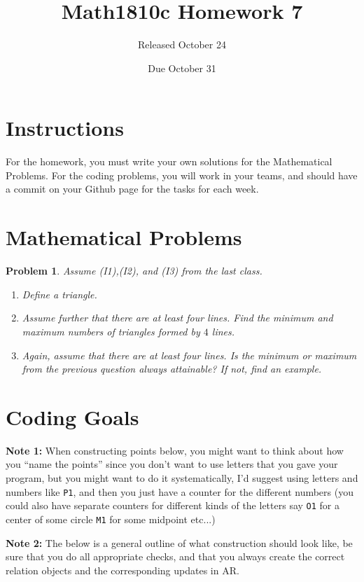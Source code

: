 \documentclass{article}
\title{Math1810c Homework 7}
\author{Released October 24}
\date{Due October 31}
\newtheorem{problem}{Problem}
\begin{document}
\maketitle

\section{Instructions}

For the homework, you must write your own solutions for the Mathematical Problems. For the coding problems, you will work in your teams, and should have a commit on your Github page for the tasks for each week. 

\section{Mathematical Problems}

\begin{problem}
Assume (I1),(I2), and (I3) from the last class.
\begin{enumerate}
    \item Define a triangle.
    \item Assume further that there are at least four lines. Find the minimum and maximum numbers of triangles formed by $4$ lines.
    \item Again, assume that there are at least four lines. Is the minimum or maximum from the previous question always attainable? If not, find an example.
\end{enumerate}
\end{problem}

\newpage

\section{Coding Goals}

\textbf{Note 1:} When constructing points below, you might want to think about how you ``name the points'' since you don't want to use letters that you gave your program, but you might want to do it systematically, I'd suggest using letters and numbers like \verb|P1|, and then you just have a counter for the different numbers (you could also have separate counters for different kinds of the letters say \verb|O1| for a center of some circle \verb|M1| for some midpoint etc...)

\noindent\textbf{Note 2:} The below is a general outline of what construction should look like, be sure that you do all appropriate checks, and that you always create the correct relation objects and the corresponding updates in AR. 
\end{document}
